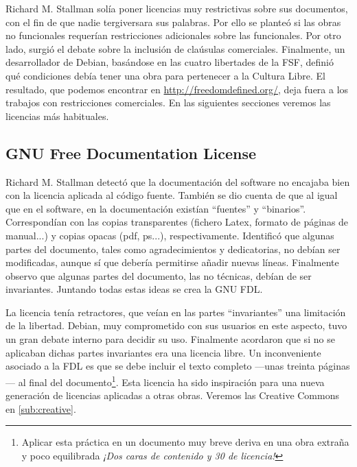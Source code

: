 Richard M. Stallman solía poner licencias muy restrictivas sobre sus
documentos, con el fin de que nadie tergiversara sus palabras. Por
ello se planteó si las obras no funcionales requerían restricciones
adicionales sobre las funcionales. Por otro lado, surgió el debate
sobre la inclusión de claúsulas comerciales. Finalmente, un
desarrollador de Debian, basándose en las cuatro libertades de la FSF,
definió qué condiciones debía tener una obra para pertenecer a la
Cultura Libre. El resultado, que podemos encontrar en
\url{http://freedomdefined.org/}, deja fuera a los trabajos con
restricciones comerciales. En las siguientes secciones veremos las
licencias más habituales.

\subsection{GNU Free Documentation License}

Richard M. Stallman detectó que la documentación del software no
encajaba bien con la licencia aplicada al código fuente. También se
dio cuenta de que al igual que en el software, en la documentación
existían ``fuentes'' y ``binarios''. Correspondían con las copias
transparentes (fichero Latex, formato de páginas de manual...) y
copias opacas (pdf, ps...), respectivamente. Identificó que algunas
partes del documento, tales como agradecimientos y dedicatorias, no
debían ser modificadas, aunque sí que debería permitirse añadir nuevas
líneas. Finalmente observo que algunas partes del documento, las no
técnicas, debían de ser invariantes. Juntando todas estas ideas se
crea la GNU FDL.

La licencia tenía retractores, que veían en las partes ``invariantes''
una limitación de la libertad. Debian, muy comprometido con sus
usuarios en este aspecto, tuvo un gran debate interno para decidir su
uso. Finalmente acordaron que si no se aplicaban dichas partes
invariantes era una licencia libre. Un inconveniente asociado a la FDL
es que se debe incluir el texto completo ---unas treinta páginas--- al
final del documento\footnote{Aplicar esta práctica en un documento muy
  breve deriva en una obra extraña y poco equilibrada \emph{¡Dos caras
    de contenido y 30 de licencia!}}. Esta licencia ha sido
inspiración para una nueva generación de licencias aplicadas a otras
obras. Veremos las Creative Commons en \ref{sub:creative}.

